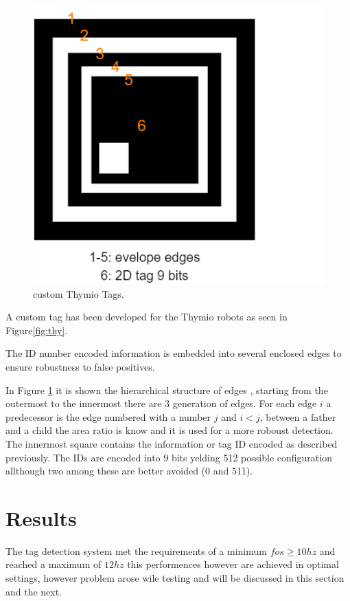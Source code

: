\documentclass[a4paper]{report}
\begin{document}
\begin{figure}
    \centering
    \includegraphics[scale=0.35]{tag_pro.png}
    \caption{custom Thymio Tags.}
    \label{fig:tagp}
\end{figure}

A custom tag has been developed for the Thymio robots as seen in Figure\ref{fig:thy}.

The ID number encoded information is embedded into several enclosed edges to ensure robustness to false positives.

In Figure \ref{fig:tagp} it is shown the hierarchical structure of edges , starting from the outermost to the innermost there are 3 generation of edges. For each edge $i$ a predecessor is the edge numbered with a number $j$ and $i<j$, between a father and a child the area ratio is know and it is used for a more roboust detection. The innermost square contains the information or tag ID encoded as described previously. The IDs are encoded into 9 bits yelding 512 possible configuration allthough two among these are better avoided (0 and 511).\newline \newline

\newpage 

\section{Results}

The tag detection system met the requirements of a minimum $fos \geq 10hz$ and reached a maximum of $12 hz$ this performences however are achieved in optimal settings, however problem arose wile testing and will be discussed in this section and the next.
\end{document}
